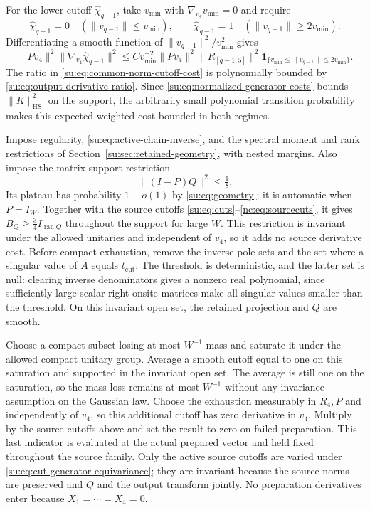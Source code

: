 \documentclass[11pt]{article}
\numberwithin{equation}{section}
\theoremstyle{remark}
\newcommand{\ran}{\operatorname{ran}}
\newcommand{\HS}{\mathrm{HS}}
\begin{document}
For the lower cutoff $\widehat\chi_{q-1}$, take $v_{\min}$ with
$\nabla_{v_4}v_{\min}=0$ and require
\[
 \widehat\chi_{q-1}=0\quad(\|v_{q-1}\|\le v_{\min}),\qquad
 \widehat\chi_{q-1}=1\quad(\|v_{q-1}\|\ge2v_{\min}).
\]
Differentiating a smooth function of $\|v_{q-1}\|^2/v_{\min}^2$ gives
\begin{equation}\label{su:eq:common-norm-cutoff-cost}
 \|Pv_4\|^2\|\nabla_{v_4}\widehat\chi_{q-1}\|^2
 \le Cv_{\min}^{-2} \|Pv_4\|^2\|R_{[q-1,5]}\|^2
       \mathbf1_{\{v_{\min}\le\|v_{q-1}\|\le2v_{\min}\}}.
\end{equation}
The ratio in \eqref{su:eq:common-norm-cutoff-cost} is polynomially
bounded by \eqref{su:eq:output-derivative-ratio}. Since
\eqref{su:eq:normalized-generator-costs} bounds $\|K\|_{\HS}^2$ on the
support, the arbitrarily small polynomial transition probability makes
this expected weighted cost bounded in both regimes.

Impose regularity, \eqref{su:eq:active-chain-inverse}, and the spectral
moment and rank restrictions of Section~\ref{su:sec:retained-geometry},
with nested margins. Also impose the matrix support restriction
\begin{equation}\label{su:eq:compatibility-cutoff}
 \|(I-P)Q\|^2\le\tfrac18.
\end{equation}
Its plateau has probability $1-o(1)$ by \eqref{su:eq:geometry}; it is
automatic when $P=I_W$. Together with the source cutoffs
\eqref{su:eq:cuts}--\eqref{nc:eq:sourcecuts}, it gives
$B_Q\ge\tfrac34 I_{\ran Q}$ throughout the support for large $W$.
This restriction is invariant under the allowed unitaries and
independent of $v_4$, so it adds no source derivative cost.
Before compact exhaustion, remove the inverse-pole
sets and the set where a singular value of $A$ equals $t_{\mathrm{cut}}$.
The threshold is deterministic, and the latter set
is null: clearing inverse denominators gives a nonzero real polynomial,
since sufficiently large scalar right onsite matrices make all singular
values smaller than the threshold. On this invariant open set, the
retained projection and $Q$ are smooth.

Choose a compact subset losing at most $W^{-1}$ mass and saturate it
under the allowed compact unitary group. Average a smooth cutoff equal
to one on this saturation and supported in the invariant open set.
The average is still one on the saturation, so the mass loss remains
at most $W^{-1}$ without any invariance assumption on the Gaussian law.
Choose the exhaustion measurably in $R_4,P$ and independently of $v_4$,
so this additional cutoff has zero derivative in $v_4$.
Multiply by the source cutoffs above and set the result to zero on
failed preparation. This last indicator is evaluated at the actual
prepared vector and held fixed throughout the source family. Only the
active source cutoffs are varied under \eqref{su:eq:cut-generator-equivariance};
they are invariant because the source norms are preserved and $Q$ and
the output transform jointly. No preparation derivatives enter because
$X_1=\cdots=X_4=0$.
\end{document}
